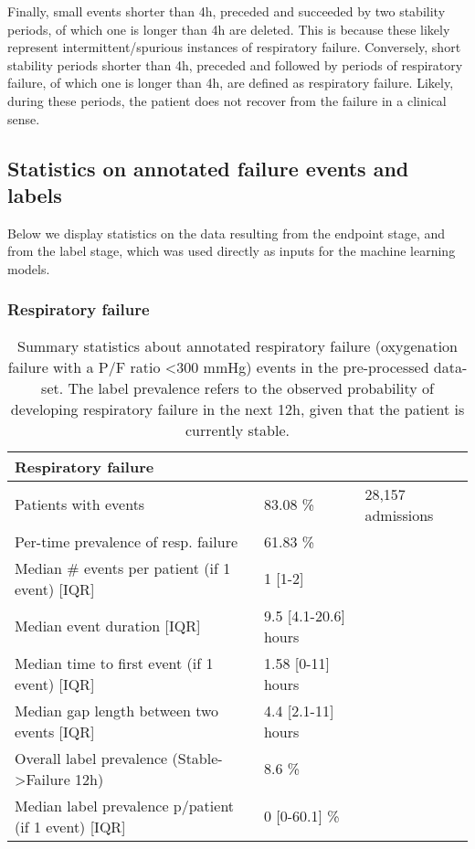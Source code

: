 \documentclass{article}
\begin{document}
Finally, small events shorter than 4h, preceded and succeeded by two stability periods, of which one is longer than 4h are deleted. This is because these likely represent intermittent/spurious instances of respiratory failure. Conversely, short stability periods shorter than 4h, preceded and followed by periods of respiratory failure, of which one is longer than 4h, are defined as respiratory failure. Likely, during these periods, the patient does not recover from the failure in a clinical sense.

\subsection*{Statistics on annotated failure events and labels}

Below we display statistics on the data resulting from the endpoint stage, and from the label stage, which was used directly as inputs for the machine learning models.

\subsubsection*{Respiratory failure}

\begin{table}[ht!]
\caption{Summary statistics about annotated respiratory failure (oxygenation failure with a P/F ratio <300 mmHg) events in the pre-processed data-set. The
label prevalence refers to the observed probability of developing respiratory failure in the next 12h, given that the patient is currently stable.}
\footnotesize
\begin{center}
{\selectfont\small
\begin{tabular}{lll}
\toprule
\textbf{Respiratory failure} & & \\
\midrule
Patients with events & 83.08 \%  & 28,157 admissions \\
Per-time prevalence of resp. failure & 61.83 \% & \\ 
Median \# events per patient (if  1 event) [IQR] & 1 [1-2] & \\
Median event duration [IQR] & 9.5 [4.1-20.6] hours & \\
Median time to first event (if  1 event) [IQR] & 1.58 [0-11] hours  & \\
Median gap length between two events [IQR] & 4.4 [2.1-11] hours & \\
\midrule
Overall label prevalence (Stable->Failure 12h) & 8.6 \% & \\
Median label prevalence p/patient (if  1 event) [IQR] & 0 [0-60.1] \% \\
\bottomrule
\end{tabular}}
\end{center}
\label{tab:appendix-resp-failure-statistics}
\end{table}
\end{document}

